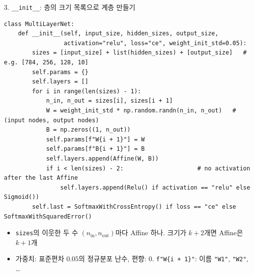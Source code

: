 \documentclass[aspectratio=169,11pt]{beamer}
\newcommand{\code}[1]{\texttt{#1}}
\begin{document}
\begin{frame}[fragile]{3. \code{\_\_init\_\_}: 층의 크기 목록으로 계층 만들기}
\begin{lstlisting}[basicstyle=\ttfamily\fontsize{7.5}{8.4}\selectfont]
class MultiLayerNet:
    def __init__(self, input_size, hidden_sizes, output_size,
                 activation="relu", loss="ce", weight_init_std=0.05):
        sizes = [input_size] + list(hidden_sizes) + [output_size]   # e.g. [784, 256, 128, 10]
        self.params = {}
        self.layers = []
        for i in range(len(sizes) - 1):
            n_in, n_out = sizes[i], sizes[i + 1]
            W = weight_init_std * np.random.randn(n_in, n_out)   # (input nodes, output nodes)
            B = np.zeros((1, n_out))
            self.params[f"W{i + 1}"] = W
            self.params[f"B{i + 1}"] = B
            self.layers.append(Affine(W, B))
            if i < len(sizes) - 2:                     # no activation after the last Affine
                self.layers.append(Relu() if activation == "relu" else Sigmoid())
        self.last = SoftmaxWithCrossEntropy() if loss == "ce" else SoftmaxWithSquaredError()
\end{lstlisting}
\small
\begin{itemize}
\item \code{sizes}의 이웃한 두 수 $(n_{\text{in}}, n_{\text{out}})$마다 Affine 하나. 크기가 $k+2$개면 Affine은 $k+1$개
\item 가중치: 표준편차 $0.05$의 정규분포 난수, 편향: $0$. \code{f"W\{i + 1\}"}: 이름 \code{"W1"}, \code{"W2"}, \ldots
\end{itemize}
\end{frame}
\end{document}
